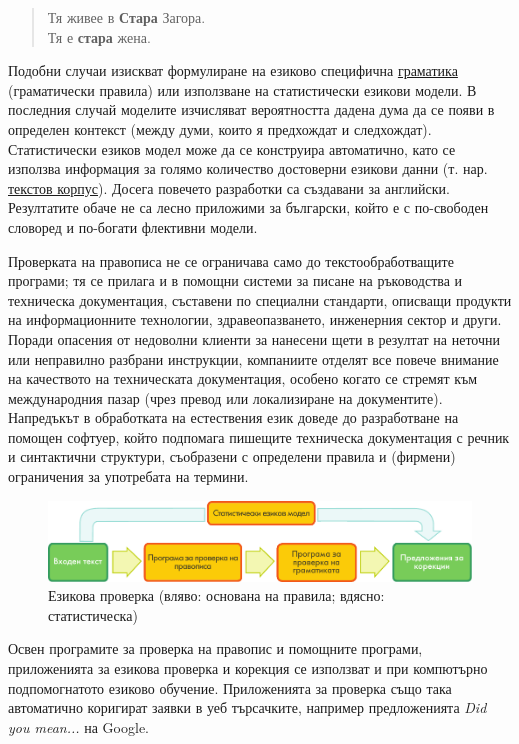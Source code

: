 \documentclass[]{../../metanetpaper}
\begin{document}
\begin{multicols}{2}
\begin{quote}
  Тя живее в \textbf{Стара} Загора.\\
  Тя е \textbf{стара} жена.
\end{quote}

Подобни случаи изискват формулиране на езиково специфична \uline{граматика} (граматически правила) или използване на статистически езикови модели. В последния случай моделите изчисляват вероятността дадена дума да се появи в определен контекст (между думи, които я предхождат и следхождат). 
Статистически езиков модел може да се конструира автоматично, като се използва информация за голямо количество достоверни езикови данни (т. нар. \uline{текстов корпус}). Досега повечето разработки са създавани за английски. Резултатите обаче не са лесно приложими за български, който е с по-свободен словоред и по-богати флективни модели. 

Проверката на правописа не се ограничава само до текстообработващите програми; тя се прилага и в помощни системи за писане на ръководства и техническа документация, съставени по специални стандарти, описващи продукти на информационните технологии, здравеопазването, инженерния сектор и други. 
Поради опасения от недоволни клиенти за нанесени щети в резултат на неточни или неправилно разбрани инструкции, компаниите отделят все повече внимание на качеството на техническата документация, особено когато се стремят към международния пазар (чрез превод или локализиране на документите).
Напредъкът в обработката на естествения език доведе до разработване на помощен софтуер, който подпомага пишещите техническа документация с речник и синтактични структури, съобразени с определени правила и (фирмени) ограничения за употребата на термини. 

\begin{figure}[htb]
  \center
  \includegraphics[width=\textwidth]{../_media/bulgarian/language_checking}
  \caption{Езикова проверка (вляво: основана на правила; вдясно: статистическа)}
  \label{fig:langcheckingaarch_de}
\end{figure}

Освен програмите за проверка на правопис и помощните програми, приложенията за езикова проверка и корекция се използват и при компютърно подпомогнатото езиково обучение. Приложенията за проверка също така автоматично коригират заявки в уеб търсачките, например предложенията \textit{Did you mean...} на Google.


\end{multicols}
\end{document}
